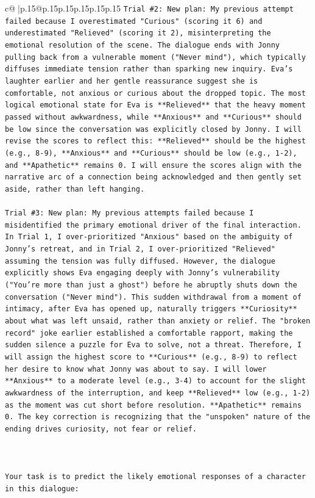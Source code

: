 \documentclass{article}
\begin{document}
{\begin{supertabular}{c@{$\;$}|p{.15\linewidth}@{}p{.15\linewidth}p{.15\linewidth}p{.15\linewidth}p{.15\linewidth}p{.15\linewidth}}
{{{\texttt{Trial \#2: New plan: My previous attempt failed because I overestimated "Curious" (scoring it 6) and underestimated "Relieved" (scoring it 2), misinterpreting the emotional resolution of the scene. The dialogue ends with Jonny pulling back from a vulnerable moment ("Never mind"), which typically diffuses immediate tension rather than sparking new inquiry. Eva's laughter earlier and her gentle reassurance suggest she is comfortable, not anxious or curious about the dropped topic. The most logical emotional state for Eva is **Relieved** that the heavy moment passed without awkwardness, while **Anxious** and **Curious** should be low since the conversation was explicitly closed by Jonny. I will revise the scores to reflect this: **Relieved** should be the highest (e.g., 8{-}9), **Anxious** and **Curious** should be low (e.g., 1{-}2), and **Apathetic** remains 0. I will ensure the scores align with the narrative arc of a connection being acknowledged and then gently set aside, rather than left hanging.} \\
\\ 
\texttt{Trial \#3: New plan: My previous attempts failed because I misidentified the primary emotional driver of the final interaction. In Trial 1, I over{-}prioritized "Anxious" based on the ambiguity of Jonny's retreat, and in Trial 2, I over{-}prioritized "Relieved" assuming the tension was fully diffused. However, the dialogue explicitly shows Eva engaging deeply with Jonny's vulnerability ("You're more than just a ghost") before he abruptly shuts down the conversation ("Never mind"). This sudden withdrawal from a moment of intimacy, after Eva has opened up, naturally triggers **Curiosity** about what was left unsaid, rather than anxiety or relief. The "broken record" joke earlier established a comfortable rapport, making the sudden silence a puzzle for Eva to solve, not a threat. Therefore, I will assign the highest score to **Curious** (e.g., 8{-}9) to reflect her desire to know what Jonny was about to say. I will lower **Anxious** to a moderate level (e.g., 3{-}4) to account for the slight awkwardness of the interruption, and keep **Relieved** low (e.g., 1{-}2) as the moment was cut short before resolution. **Apathetic** remains 0. The key correction is recognizing that the "unspoken" nature of the ending drives curiosity, not fear or relief.} \\
\\ 
\\ 
\\ 
\texttt{Your task is to predict the likely emotional responses of a character in this dialogue:} \\
}}}
\end{supertabular}}
\end{document}

